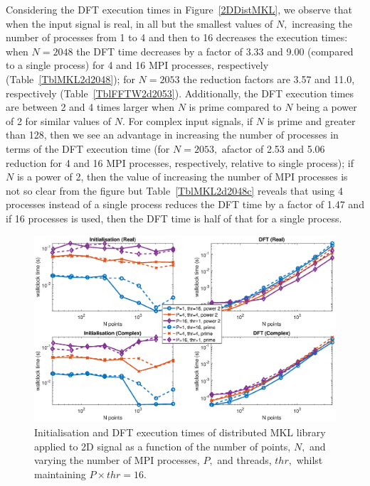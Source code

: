 \documentclass[a4paper]{article}
\begin{document}
Considering the DFT execution times in Figure~\ref{2DDistMKL}, we
observe that when the input signal is real, in all but the smallest
values of $N,$ increasing the number of processes from 1 to 4 and then
to 16 decreases the execution times: when $N=2048$ the DFT time
decreases by a factor of 3.33 and 9.00 (compared to a single process)
for 4 and 16 MPI processes, respectively (Table~\ref{TblMKL2d2048});
for $N=2053$ the reduction factors are 3.57 and 11.0, respectively
(Table~\ref{TblFFTW2d2053}). Additionally, the DFT execution times
are between 2 and 4 times larger when $N$ is prime compared to $N$
being a power of 2 for similar values of $N.$ For complex input
signals, if $N$ is prime and greater than 128, then we see an
advantage in increasing the number of processes in terms of the DFT
execution time (for $N=2053,$ afactor of 2.53 and 5.06 reduction for 4
and 16 MPI processes, respectively, relative to single process); if
$N$ is a power of 2, then the value of increasing the number of MPI
processes is not so clear from the figure but
Table~\ref{TblMKL2d2048c} reveals that using 4 processes instead of a
single process reduces the DFT time by a factor of 1.47 and if 16
processes is used, then the DFT time is half of that for a single
process.


\begin{figure}[htb]
    \centering
    \includegraphics[width=0.9\linewidth]{../results/mkl_2d_mpi_thr.eps}
  \caption{Initialisation and DFT execution times of distributed MKL library applied to 2D signal as a function of the
    number of points, $N,$ and varying the number of MPI processes, $P,$ and threads, $thr,$ whilst maintaining $P\times thr=16.$}
  \label{2DDistMKL16}
\end{figure}
\end{document}
